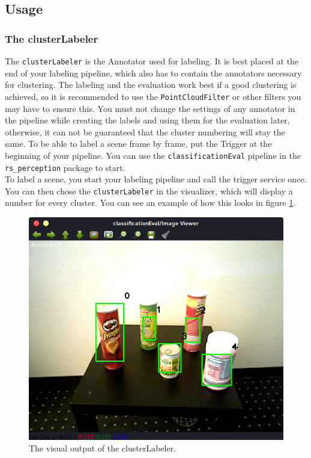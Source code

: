 \documentclass[main.tex]{subfiles}
\begin{document}
\subsection{Usage}

\subsubsection{The clusterLabeler}
The \texttt{clusterLabeler} is the Annotator used for labeling. It is best placed at the end of your labeling pipeline, which also has to contain the annotators necessary for clustering. The labeling and the evaluation work best if a good clustering is achieved, so it is recommended to use the \texttt{PointCloudFilter} or other filters you may have to ensure this. You must not change the settings of any annotator in the pipeline while creating the labels and using them for the evaluation later, otherwise, it can not be guaranteed that the cluster numbering will stay the same. To be able to label a scene frame by frame, put the Trigger at the beginning of your pipeline. You can use the \texttt{classificationEval} pipeline in the \texttt{rs\_perception} package to start.\\

To label a scene, you start your labeling pipeline and call the trigger service once. You can then chose the \texttt{clusterLabeler} in the visualizer, which will display a number for every cluster. You can see an example of how this looks in figure \ref{fig:clusterLabeler visualization}.
\begin{figure}
  \includegraphics[width=\linewidth]{pictures/perception/cluster_numbering.png}
  \caption{The visual output of the clusterLabeler.}
  \label{fig:clusterLabeler visualization}
\end{figure}
\end{document}
